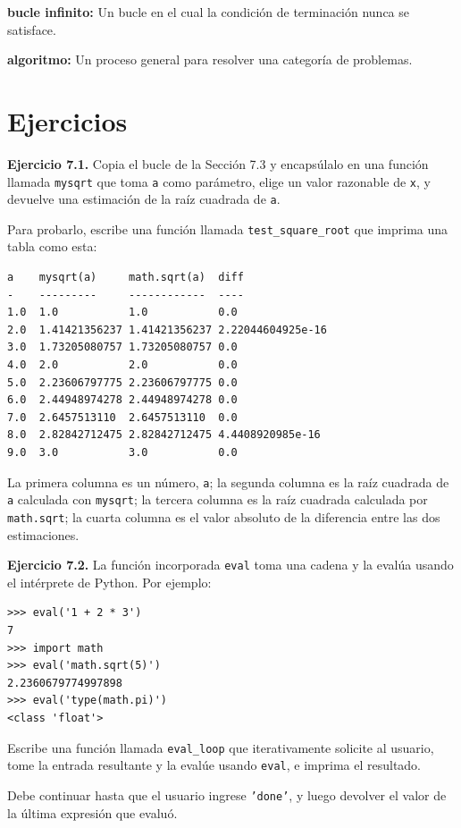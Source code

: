 \textbf{bucle infinito:} Un bucle en el cual la condición de terminación nunca se satisface.

\textbf{algoritmo:} Un proceso general para resolver una categoría de problemas.

\section{Ejercicios}

\textbf{Ejercicio 7.1.} Copia el bucle de la Sección 7.3 y encapsúlalo en una función llamada \texttt{mysqrt} que toma \texttt{a} como parámetro, elige un valor razonable de \texttt{x}, y devuelve una estimación de la raíz cuadrada de \texttt{a}.

Para probarlo, escribe una función llamada \texttt{test\_square\_root} que imprima una tabla como esta:

\begin{lstlisting}
a    mysqrt(a)     math.sqrt(a)  diff
-    ---------     ------------  ----
1.0  1.0           1.0           0.0
2.0  1.41421356237 1.41421356237 2.22044604925e-16
3.0  1.73205080757 1.73205080757 0.0
4.0  2.0           2.0           0.0
5.0  2.23606797775 2.23606797775 0.0
6.0  2.44948974278 2.44948974278 0.0
7.0  2.6457513110  2.6457513110  0.0
8.0  2.82842712475 2.82842712475 4.4408920985e-16
9.0  3.0           3.0           0.0
\end{lstlisting}

La primera columna es un número, \texttt{a}; la segunda columna es la raíz cuadrada de \texttt{a} calculada con \texttt{mysqrt}; la tercera columna es la raíz cuadrada calculada por \texttt{math.sqrt}; la cuarta columna es el valor absoluto de la diferencia entre las dos estimaciones.

\textbf{Ejercicio 7.2.} La función incorporada \texttt{eval} toma una cadena y la evalúa usando el intérprete de Python. Por ejemplo:

\begin{lstlisting}
>>> eval('1 + 2 * 3')
7
>>> import math
>>> eval('math.sqrt(5)')
2.2360679774997898
>>> eval('type(math.pi)')
<class 'float'>
\end{lstlisting}

Escribe una función llamada \texttt{eval\_loop} que iterativamente solicite al usuario, tome la entrada resultante y la evalúe usando \texttt{eval}, e imprima el resultado.

Debe continuar hasta que el usuario ingrese \texttt{'done'}, y luego devolver el valor de la última expresión que evaluó.

